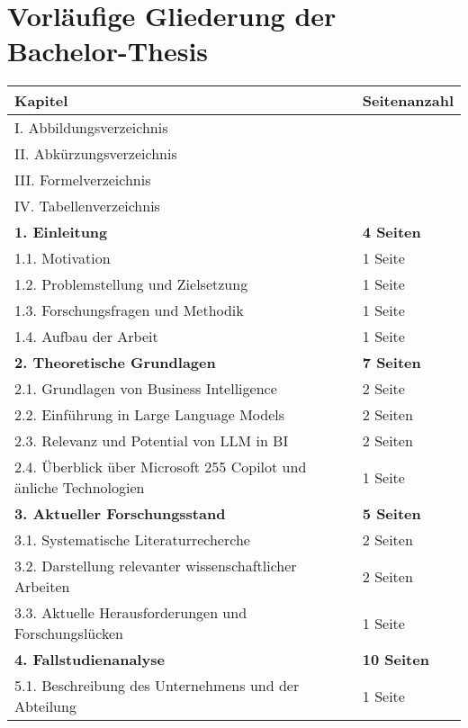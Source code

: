 
\section{Vorläufige Gliederung der Bachelor-Thesis}


\begin{longtable}{|p{9cm}|p{2.5cm}|}
    \hline
    \textbf{Kapitel} & \textbf{Seitenanzahl} \\
    \hline
    I.      Abbildungsverzeichnis & \\
    \hline
    II.     Abkürzungsverzeichnis & \\
    \hline
    III.    Formelverzeichnis & \\
    \hline
    IV.     Tabellenverzeichnis & \\
    \hline
    \textbf{1. Einleitung} & \textbf{4 Seiten} \\
    \hline
        1.1. Motivation & 1 Seite \\
        \hline
        1.2. Problemstellung und Zielsetzung & 1 Seite \\
        \hline
        1.3. Forschungsfragen und Methodik & 1 Seite \\
        \hline
        1.4. Aufbau der Arbeit & 1 Seite \\
    \hline
    \textbf{2. Theoretische Grundlagen} & \textbf{7 Seiten} \\
    \hline
        2.1. Grundlagen von Business Intelligence & 2 Seite \\
        \hline
        2.2. Einführung in Large Language Models & 2 Seiten \\
        \hline
        2.3. Relevanz und Potential von LLM in BI & 2 Seiten \\
        \hline
        2.4. Überblick über Microsoft 255 Copilot und änliche Technologien & 1 Seite \\
    \hline
    \textbf{3. Aktueller Forschungsstand} & \textbf{5 Seiten} \\
    \hline
        3.1. Systematische Literaturrecherche & 2 Seiten \\
        \hline
        3.2. Darstellung relevanter wissenschaftlicher Arbeiten & 2 Seiten \\
        \hline
        3.3. Aktuelle Herausforderungen und Forschungslücken & 1 Seite \\
    \hline
    \textbf{4. Fallstudienanalyse} & \textbf{10 Seiten} \\
    \hline
        5.1. Beschreibung des Unternehmens und der Abteilung & 1 Seite \\

\end{longtable}

